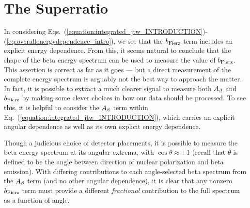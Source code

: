 



\section{The Superratio}
\label{signature_chapter}
In considering Eqs.~(\ref{equation:integrated_jtw_INTRODUCTION})-(\ref{eq:overallenergydependence_intro}), we see that the $b_{\mathrm{Fierz}}$ term includes an explicit energy dependence.  From this, it seems natural to conclude that the shape of the beta energy spectrum can be used to measure the value of $b_{\mathrm{Fierz}}$.  This assertion is correct as far as it goes --- but a direct measurement of the complete energy spectrum is arguably not the best way to approach the matter.  In fact, it is possible to extract a much clearer signal to measure both $A_{\beta}$ and $b_{\mathrm{Fierz}}$ by making some clever choices in how our data should be processed.  
To see this, it is helpful to consider the $A_{\beta}$ term within Eq.~(\ref{equation:integrated_jtw_INTRODUCTION}), which carries an explicit angular dependence as well as its own explicit energy dependence.  

Though a judicious choice of detector placements, it is possible to measure the beta energy spectrum at its angular extrema, with $\cos\theta \approx \pm 1$ (recall that $\theta$ is defined to be the angle between direction of nuclear polarization and beta emission).  
With differing contributions to each angle-selected beta spectrum from the $A_{\beta}$ term (and no other angular dependence), it is clear that any nonzero $b_{\mathrm{Fierz}}$ term must provide a different \emph{fractional} contribution to the full spectrum as a function of angle.

